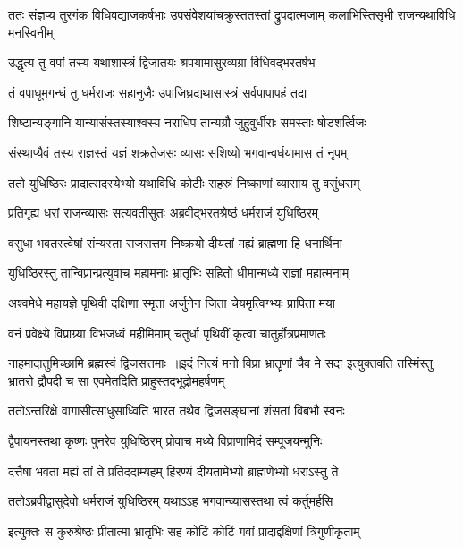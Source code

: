 \threelineshloka
{ततः संज्ञप्य तुरगंक विधिवद्याजकर्षभाः}
{उपसंवेशयांचक्रुस्ततस्तां द्रुपदात्मजाम्}
{कलाभिस्तिसृभी राजन्यथाविधि मनस्विनीम्}


\twolineshloka
{उद्धृत्य तु वपां तस्य यथाशास्त्रं द्विजातयः}
{श्रपयामासुरव्यग्रा विधिवद्भरतर्षभ}


\twolineshloka
{तं वपाधूमगन्धं तु धर्मराजः सहानुजैः}
{उपाजिघ्रद्यथासास्त्रं सर्वपापापहं तदा}


\twolineshloka
{शिष्टान्यङ्गानि यान्यासंस्तस्याश्वस्य नराधिप}
{तान्यग्रौ जुहुवुर्धीराः समस्ताः षोडशर्त्विजः}


\twolineshloka
{संस्थाप्यैवं तस्य राज्ञस्तं यज्ञं शक्रतेजसः}
{व्यासः सशिष्यो भगवान्वर्धयामास तं नृपम्}


\twolineshloka
{ततो युधिष्ठिरः प्रादात्सदस्येभ्यो यथाविधि}
{कोटीः सहस्रं निष्काणां व्यासाय तु वसुंधराम्}


\twolineshloka
{प्रतिगृह्य धरां राजन्व्यासः सत्यवतीसुतः}
{अब्रवीद्भरतश्रेष्ठं धर्मराजं युधिष्ठिरम्}


\twolineshloka
{वसुधा भवतस्त्वेषां संन्यस्ता राजसत्तम}
{निष्क्रयो दीयतां मह्यं ब्राह्मणा हि धनार्थिना}


\twolineshloka
{युधिष्ठिरस्तु तान्विप्रान्प्रत्युवाच महामनाः}
{भ्रातृभिः सहितो धीमान्मध्ये राज्ञां महात्मनाम्}


\twolineshloka
{अश्वमेधे महायज्ञे पृथिवी दक्षिणा स्मृता}
{अर्जुनेन जिता चेयमृत्विग्भ्यः प्रापिता मया}


\twolineshloka
{वनं प्रवेक्ष्ये विप्राग्र्या विभजध्वं महीमिमाम्}
{चतुर्धा पृथिवीं कृत्वा चातुर्होत्रप्रमाणतः}


नाहमादातुमिच्छामि ब्रह्मस्वं द्विजसत्तमाः ॥इदं नित्यं मनो विप्रा भ्रातॄणां चैव मे सदा
\twolineshloka
{इत्युक्तवति तस्मिंस्तु भ्रातरो द्रौपदी च सा}
{एवमेतदिति प्राहुस्तदभूद्रोमहर्षणम्}


\twolineshloka
{ततोऽन्तरिक्षे वागासीत्साधुसाध्विति भारत}
{तथैव द्विजसङ्घानां शंसतां विबभौ स्वनः}


\twolineshloka
{द्वैपायनस्तथा कृष्णः पुनरेव युधिष्ठिरम्}
{प्रोवाच मध्ये विप्राणामिदं सम्पूजयन्मुनिः}


\twolineshloka
{दत्तैषा भवता मह्यं तां ते प्रतिददाम्यहम्}
{हिरण्यं दीयतामेभ्यो ब्राह्मणेभ्यो धराऽस्तु ते}


\twolineshloka
{ततोऽब्रवीद्वासुदेवो धर्मराजं युधिष्ठिरम्}
{यथाऽऽह भगवान्व्यासस्तथा त्वं कर्तुमर्हसि}


\twolineshloka
{इत्युक्तः स कुरुश्रेष्ठः प्रीतात्मा भ्रातृभिः सह}
{कोटिं कोटिं गवां प्रादाद्दक्षिणां त्रिगुणीकृताम्}


